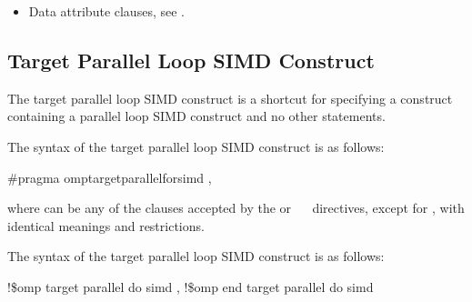 {{{{\begin{itemize}
\item Data attribute clauses, see
.

\end{itemize}










\subsection{Target Parallel Loop SIMD Construct}
\label{subsec:Target Parallel Loop SIMD Construct}
\summary
The target parallel loop SIMD construct is a shortcut for specifying a  
construct containing a parallel loop SIMD construct and no other statements.

\syntax
\ccppspecificstart
The syntax of the target parallel loop SIMD construct is as follows:

\begin{boxedcode}
\#pragma omp\plc{ }target\plc{ }parallel\plc{ }for\plc{ }simd \plc{[clause[
[},\plc{] clause] ... ] new-line}
\end{boxedcode}

where  can be any of the clauses accepted by the  or
~~ directives, except for , with identical meanings and restrictions.
\ccppspecificend

\begin{samepage}
\fortranspecificstart
The syntax of the target parallel loop SIMD construct is as follows:

\begin{boxedcode}
!\$omp target parallel do simd \plc{[clause[ [},\plc{] clause] ... ]}
\plc{[}!\$omp end target parallel do simd\plc{]}
\end{boxedcode}
\end{samepage}

}}}}
